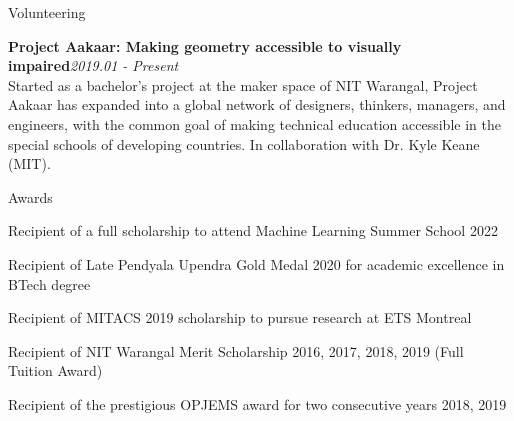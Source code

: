 \documentclass{resume}
\begin{document}
  \begin{rSection}{Volunteering} \itemsep -4pt 
    \item {\bf Project Aakaar: Making geometry accessible to visually impaired}\hfill {\em 2019.01 - Present}\\
    Started as a bachelor's project at the maker space of NIT Warangal, Project Aakaar has expanded into a global network of designers, thinkers, managers, and engineers, with the common goal of making technical education accessible in the special schools of developing countries. In collaboration with Dr. Kyle Keane (MIT).
  \end{rSection}

  \begin{rSection}{Awards} \itemsep -4pt 
    \item Recipient of a full scholarship to attend Machine Learning Summer School 2022
    \item Recipient of Late Pendyala Upendra Gold Medal 2020 for academic excellence in BTech degree
    \item Recipient of MITACS 2019 scholarship to pursue research at ETS Montreal \hfill 
    \item Recipient of NIT Warangal Merit Scholarship 2016, 2017, 2018, 2019 (Full Tuition Award)
    \item Recipient of the prestigious OPJEMS award for two consecutive years 2018, 2019 \hfill 
  \end{rSection}
\end{document}
